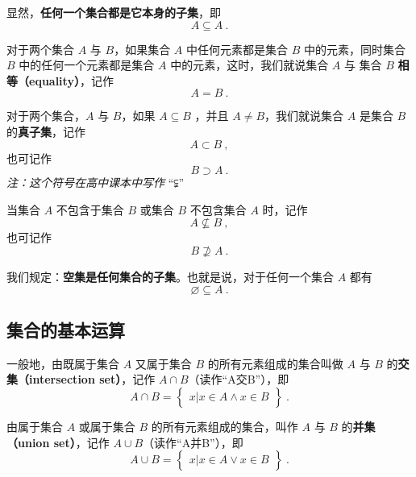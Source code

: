 显然，\textbf{任何一个集合都是它本身的子集}，即
\begin{equation}
A \subseteq A~.
\end{equation}

对于两个集合 $A$ 与 $B$，如果集合 $A$ 中任何元素都是集合 $B$ 中的元素，同时集合 $B$ 中的任何一个元素都是集合 $A$ 中的元素，这时，我们就说集合 $A$ 与 集合 $B$ \textbf{相等（equality）}，记作
\begin{equation}
A=B~.
\end{equation}

对于两个集合，$A$ 与 $B$，如果 $A\subseteq B$ ，并且 $A \ne B$，我们就说集合 $A$ 是集合 $B$ 的\textbf{真子集}，记作
\begin{equation}
A \subset B~,
\end{equation}
也可记作
\begin{equation}
B \supset A~.
\end{equation}
\textsl{注：这个符号在高中课本中写作} “⫋”

当集合 $A$ 不包含于集合 $B$ 或集合 $B$ 不包含集合 $A$ 时，记作
\begin{equation}
A \nsubseteq B~,
\end{equation}
也可记作
\begin{equation}
B \nsupseteq A~.
\end{equation}

我们规定：\textbf{空集是任何集合的子集}。也就是说，对于任何一个集合 $A$ 都有
\begin{equation}
\varnothing \subseteq A~.
\end{equation}

\subsection{集合的基本运算}
一般地，由既属于集合 $A$ 又属于集合 $B$ 的所有元素组成的集合叫做 $A$ 与 $B$ 的\textbf{交集（intersection set）}，记作 $A \cap B$（读作“A交B”），即
\begin{equation}
A\cap B = \begin{Bmatrix} x|x\in A \wedge x\in B \end{Bmatrix}~.
\end{equation}

由属于集合 $A$ 或属于集合 $B$ 的所有元素组成的集合，叫作 $A$ 与 $B$ 的\textbf{并集（union set）}，记作 $A\cup B$（读作“A并B”），即
\begin{equation}
A\cup B = \begin{Bmatrix}x|x\in A \vee x\in B\end{Bmatrix}~.
\end{equation}

